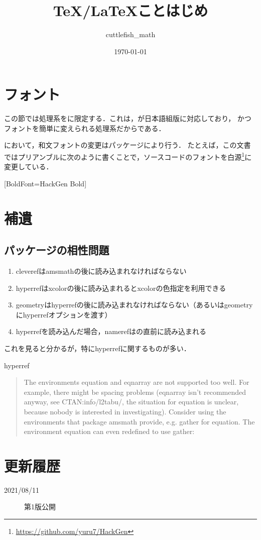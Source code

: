 \documentclass[report,paper=b5,fontsize=13Q]{jlreq}
\title{\TeX/\LaTeX ことはじめ}
\author{cuttlefish\_math}
\date{\today}
\theoremstyle{definition}
\begin{document}

\tableofcontents









\chapter{フォント}
この節では処理系を\LuaTeX に限定する．これは，\LuaTeX が日本語組版に対応しており，
かつフォントを簡単に変えられる処理系だからである．

\LuaTeX において，和文フォントの変更はパッケージにより行う．
たとえば，この文書ではプリアンブルに次のように書くことで，ソースコードのフォントを白源\footnote{\url{https://github.com/yuru7/HackGen}}に変更している．
\begin{codeblock}
\setmonofont{HackGen Regular}[BoldFont={HackGen Bold}]
\end{codeblock}

\chapter{補遺}
\section{パッケージの相性問題}
\begin{enumerate}
  \item cleverefはamsmathの後に読み込まれなければならない
  \item hyperrefはxcolorの後に読み込まれるとxcolorの色指定を利用できる
  \item geometryはhyperrefの後に読み込まれなければならない（あるいはgeometryにhyperrefオプションを渡す）  
  \item hyperrefを読み込んだ場合，namerefは\inlinecode{\begin{document}}の直前に読み込まれる
\end{enumerate}

これを見ると分かるが，特にhyperrefに関するものが多い．

hyperref
\begin{quote}
The environments equation and eqnarray are not supported too well. For example, there might
be spacing problems (eqnarray isn't recommended anyway, see CTAN:info/l2tabu/, the situation
for equation is unclear, because nobody is interested in investigating). Consider using the environments that package amsmath provide, e.g. gather for equation. The environment equation can
even redefined to use gather:
\begin{codeblock}
\usepackage{amsmath}
\let\equation\gather
\let\endequation\endgather    
\end{codeblock}
\end{quote}

\clearpage



\printindex

\chapter*{更新履歴}
\begin{description}
  \item[2021/08/11] 第1版公開
\end{description}
\end{document}
